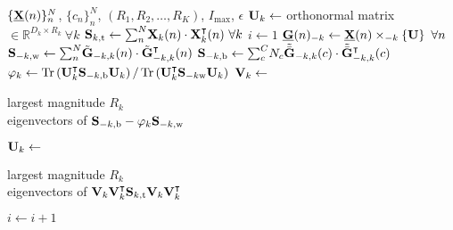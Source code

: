 \begin{algorithmic}[1]
	\Require $\{\ten{X}(n)\}_n^N$, $\{c_n\}_n^N$,
	$(R_1,R_2,\ldots,R_K)$, $I_\text{max}$, $\epsilon$
	\State $\mat{U}_k \gets $ orthonormal matrix $\in \mathbb{R}^{D_k\times R_k}
		\ \forall k$
	\State $\mat{S}_{k,\text{t}} \gets
		\textstyle{\sum_n^N}\mat{X}_k(n)\cdot\mat{X}_k^\intercal(n)\ \forall k$
	\State $i\gets 1$
	\Repeat
	\State $\ten{G}(n)_{-k} \gets \ten{X}(n)\mmprs{\mat{U}}{k} \ \forall n$
	\State $\mat{S}_{-k,\text{w}} \gets
		\textstyle{\sum_n^N}\tilde{\mat{G}}_{-k,k}(n)\cdot\tilde{\mat{G}}_{-k,k}^\intercal(n)$
	\State $\mat{S}_{-k,\text{b}} \gets
		\textstyle{\sum_c^C}N_c\tilde{\bar{\mat{G}}}_{-k,k}(c)\cdot\tilde{\bar{\mat{G}}}_{-k,k}^\intercal(c)$
	\State $\varphi_k\gets\tr\left(\mat{U}_k^\intercal \mat{S}_{-k,\text{b}}\mat{U}_k\right)/\tr\left(\mat{U}_k^\intercal\mat{S}_{-k\text{w}}\mat{U}_k\right)$
	\State $\mat{V}_k\gets$ \parbox[t]{5cm}{largest magnitude $R_k$ \\ eigenvectors of
	$\mat{S}_{-k,\text{b}} - \varphi_k\mat{S}_{-k,\text{w}}$}
	\State $\mat{U}_k \gets$ \parbox[t]{5cm}{largest magnitude $R_k$ \\
	eigenvectors of $\mat{V}_k\mat{V}_k^\intercal\mat{S}_{k,\text{t}}\mat{V}_k\mat{V}_k^\intercal$}
	\EndFor
	\State $i\gets i+1$
\end{algorithmic}

